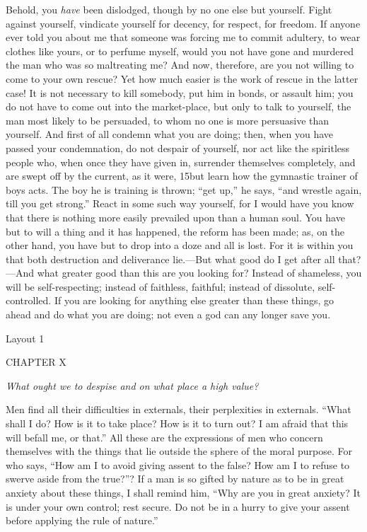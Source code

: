 Behold, you \emph{have} been dislodged, though by no one else but yourself. Fight against yourself, vindicate yourself for decency, for respect, for freedom. If anyone ever told you about me that someone was forcing me to commit adultery, to wear clothes like yours, or to perfume myself, would you not have gone and murdered the man who was so maltreating me? And now, therefore, are you not willing to come to your own rescue? Yet how much easier is the work of rescue in the latter case! It is not necessary to kill somebody, put him in bonds, or assault him; you do not have to come out into the market-place, but only to talk to yourself, the man most likely to be persuaded, to whom no one is more persuasive than yourself. And first of all condemn what you are doing; then, when you have passed your condemnation, do not despair of yourself, nor act like the spiritless people who, when once they have given in, surrender themselves completely, and are swept off by the current, as it were, 15but learn how the gymnastic trainer of boys acts. The boy he is training is thrown; ``get up,'' he says, ``and wrestle again, till you get strong.'' React in some such way yourself, for I would have you know that there is nothing more easily prevailed upon than a human soul. You have but to will a thing and it has happened, the reform has been made; as, on the other hand, you have but to drop into a doze and all is lost. For it is within you that both destruction and deliverance lie.—But what good do I get after all that?—And what greater good than this are you looking for? Instead of shameless, you will be self-respecting; instead of faithless, faithful; instead of dissolute, self-controlled. If you are looking for anything else greater than these things, go ahead and do what you are doing; not even a god can any longer save you.



Layout 1

CHAPTER X

\emph{What ought we to despise and on what place a high value?}

Men find all their difficulties in externals, their perplexities in externals. ``What shall I do? How is it to take place? How is it to turn out? I am afraid that this will befall me, or that.'' All these are the expressions of men who concern themselves with the things that lie outside the sphere of the moral purpose. For who says, ``How am I to avoid giving assent to the false? How am I to refuse to swerve aside from the true?''? If a man is so gifted by nature as to be in great anxiety about these things, I shall remind him, ``Why are you in great anxiety? It is under your own control; rest secure. Do not be in a hurry to give your assent before applying the rule of nature.''

